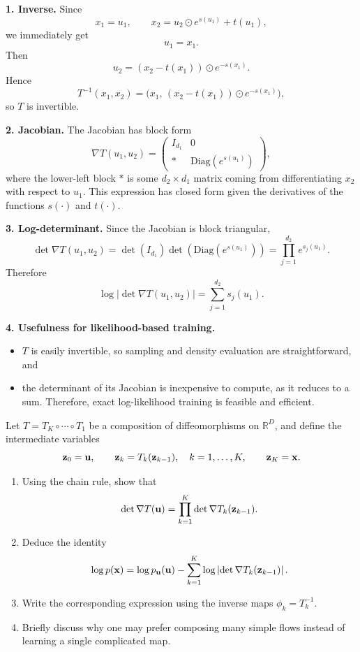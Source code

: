 \begin{solution}

\textbf{1. Inverse.}
Since
\[
x_1=u_1,\qquad x_2=u_2\odot e^{s(u_1)}+t(u_1),
\]
we immediately get
\[
u_1=x_1.
\]
Then
\[
u_2=(x_2-t(x_1))\odot e^{-s(x_1)}.
\]
Hence
\[
T^{-1}(x_1,x_2)
=
\bigl(x_1,\,(x_2-t(x_1))\odot e^{-s(x_1)}\bigr),
\]
so $T$ is invertible.

\medskip

\textbf{2. Jacobian.}
The Jacobian has block form
\[
\nabla T(u_1,u_2)
=
\begin{pmatrix}
I_{d_1} & 0\\[1mm]
* & \mathrm{Diag}(e^{s(u_1)})
\end{pmatrix},
\]
where the lower-left block $*$ is some $d_2\times d_1$ matrix coming from differentiating $x_2$ with respect to $u_1$. This expression has closed form given the derivatives of the functions $s(\cdot)$ and $t(\cdot)$.

\medskip

\textbf{3. Log-determinant.}
Since the Jacobian is block triangular,
\[
\det \nabla T(u_1,u_2)
=
\det(I_{d_1})\det(\mathrm{Diag}(e^{s(u_1)}))
=
\prod_{j=1}^{d_2} e^{s_j(u_1)}.
\]
Therefore
\[
\log |\det \nabla T(u_1,u_2)|
=
\sum_{j=1}^{d_2} s_j(u_1).
\]

\medskip

\textbf{4. Usefulness for likelihood-based  training.}
\begin{itemize}
    \item $T$ is easily invertible, so sampling and density evaluation are straightforward, and
    \item the determinant of its  Jacobian is inexpensive to compute, as it reduces to a sum. Therefore, exact log-likelihood training is feasible and efficient.
\end{itemize}

\end{solution}

\begin{exercise}
Let \(T=T_K\circ\cdots\circ T_1\) be a composition of diffeomorphisms on \(\mathbb{R}^D\), and define the intermediate variables
\[
{ \mathbf{z}}_0={ \mathbf{u}},\qquad { \mathbf{z}}_k=T_k({ \mathbf{z}}_{k-1}),\quad k=1,\dots,K,\qquad { \mathbf{z}}_K={ \mathbf{x}}.
\]

\begin{enumerate}
\item Using the chain rule, show that
\[
\det \nabla T({ \mathbf{u}})=\prod_{k=1}^K \det \nabla T_k({ \mathbf{z}}_{k-1}).
\]
\item Deduce the identity
\[
\log p({ \mathbf{x}})=\log p_{ \mathbf{u}}({ \mathbf{u}})-\sum_{k=1}^K \log \left|\det \nabla T_k({ \mathbf{z}}_{k-1})\right|.
\]
\item Write the corresponding expression using the inverse maps \(\phi_k=T_k^{-1}\).
\item Briefly discuss why one may prefer composing many simple flows instead of learning a single complicated map.
\end{enumerate}
\end{exercise}

